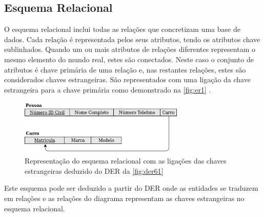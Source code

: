 \documentclass[11pt,twoside,a4paper]{report}
\begin{document}
\subsection{Esquema Relacional}
O esquema relacional inclui todas as relações que concretizam uma base de dados. Cada relação é representada pelos seus atributos, tendo os atributos chave sublinhados. Quando um ou mais atributos de relações diferentes representam o mesmo elemento do mundo real, estes são conectados. Neste caso o conjunto de atributos é chave primária de uma relação e, nas restantes relações, estes são considerados chaves estrangeiras. São representados com uma ligação da chave estrangeira para a chave primária como demonstrado na \autoref{fig:er1} \cite{Chen}.
\begin{figure}
	\begin{center}
		\includegraphics[width=0.7\textwidth]{notacao15} %
		\caption[Representação esquema relacional]{Representação do esquema relacional com as ligações das chaves estrangeiras deduzido do DER da \autoref{fig:der61}}
		\label{fig:er1}
	\end{center}
\end{figure}
Este esquema pode ser deduzido a partir do DER onde as entidades se traduzem em relações e as relações do diagrama representam as chaves estrangeiras no esquema relacional.
\end{document}
